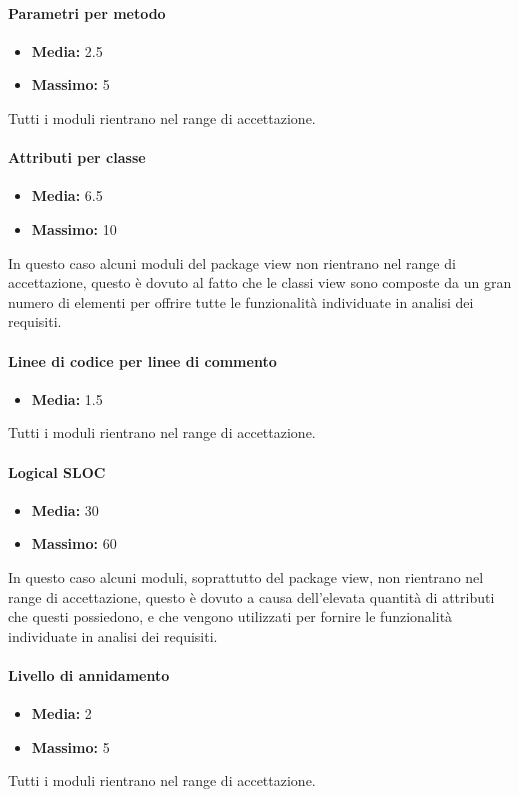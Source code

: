 \paragraph{Parametri per metodo}
\begin{itemize}
\item{\textbf{Media:}} 2.5
\item{\textbf{Massimo:}} 5
\end{itemize}
Tutti i moduli rientrano nel range di accettazione.

\paragraph{Attributi per classe}
\begin{itemize}
\item{\textbf{Media:}} 6.5
\item{\textbf{Massimo:}} 10
\end{itemize}
In questo caso alcuni moduli del package view non rientrano nel range di accettazione, questo è dovuto al fatto che le classi view sono composte da un gran numero di elementi per offrire tutte le funzionalità individuate in analisi dei requisiti.

\paragraph{Linee di codice per linee di commento}
\begin{itemize}
\item{\textbf{Media:}} 1.5
\end{itemize}
Tutti i moduli rientrano nel range di accettazione.

\paragraph{Logical SLOC}
\begin{itemize}
\item{\textbf{Media:}} 30
\item{\textbf{Massimo:}} 60
\end{itemize}
In questo caso alcuni moduli, soprattutto del package view, non rientrano nel range di accettazione, questo è dovuto a causa dell'elevata quantità di attributi che questi possiedono, e che vengono utilizzati per fornire le funzionalità individuate in analisi dei requisiti.

\paragraph{Livello di annidamento}
\begin{itemize}
\item{\textbf{Media:}} 2
\item{\textbf{Massimo:}} 5
\end{itemize}
Tutti i moduli rientrano nel range di accettazione.


